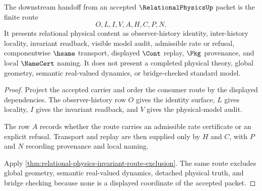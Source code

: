 \begin{theorem}
\label{thm:relational-physics-namecert-handoff}
The downstream handoff from an accepted $\RelationalPhysicsUp$ packet is the finite route
$$
O,L,I,V,A,H,C,P,N.
$$
It presents relational physical content as observer-history identity, inter-history locality, invariant readback, visible model audit, admissible rate or refusal, componentwise $\hsame$ transport, displayed $\Cont$ replay, $\Pkg$ provenance, and local $\NameCert$ naming. It does not present a completed physical theory, global geometry, semantic real-valued dynamics, or bridge-checked standard model.
\end{theorem}
\begin{proof}
Project the accepted carrier and order the consumer route by the displayed dependencies. The observer-history row $O$ gives the identity surface, $L$ gives locality, $I$ gives the invariant readback, and $V$ gives the physical-model audit.

The row $A$ records whether the route carries an admissible rate certificate or an explicit refusal. Transport and replay are then supplied only by $H$ and $C$, with $P$ and $N$ recording provenance and local naming.

Apply \autoref{thm:relational-physics-invariant-route-exclusion}. The same route excludes global geometry, semantic real-valued dynamics, detached physical truth, and bridge checking because none is a displayed coordinate of the accepted packet.
\end{proof}

